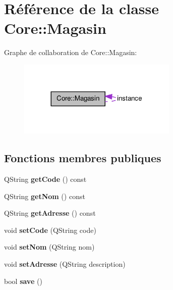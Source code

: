 \hypertarget{class_core_1_1_magasin}{
\section{Référence de la classe Core::Magasin}
\label{db/d58/class_core_1_1_magasin}
}


Graphe de collaboration de Core::Magasin:\nopagebreak
\begin{figure}[H]
\begin{center}
\leavevmode
\includegraphics[width=215pt]{dd/dd9/class_core_1_1_magasin__coll__graph}
\end{center}
\end{figure}
\subsection*{Fonctions membres publiques}
\begin{DoxyCompactItemize}
\item 
\hypertarget{class_core_1_1_magasin_a32b4c2ed780a53546f58adf1223a4ab2}{
QString {\bfseries getCode} () const }
\label{db/d58/class_core_1_1_magasin_a32b4c2ed780a53546f58adf1223a4ab2}

\item 
\hypertarget{class_core_1_1_magasin_a4a1c4c2061338b1e612f5ea5cf0f3078}{
QString {\bfseries getNom} () const }
\label{db/d58/class_core_1_1_magasin_a4a1c4c2061338b1e612f5ea5cf0f3078}

\item 
\hypertarget{class_core_1_1_magasin_a4fb857ff7d3a402cc979544fcfbdea2a}{
QString {\bfseries getAdresse} () const }
\label{db/d58/class_core_1_1_magasin_a4fb857ff7d3a402cc979544fcfbdea2a}

\item 
\hypertarget{class_core_1_1_magasin_a9008fda6fea2f34438477ff902ce0e58}{
void {\bfseries setCode} (QString code)}
\label{db/d58/class_core_1_1_magasin_a9008fda6fea2f34438477ff902ce0e58}

\item 
\hypertarget{class_core_1_1_magasin_a6b068992df353cb27b0230f9c6be4392}{
void {\bfseries setNom} (QString nom)}
\label{db/d58/class_core_1_1_magasin_a6b068992df353cb27b0230f9c6be4392}

\item 
\hypertarget{class_core_1_1_magasin_a51aff2a2720390d4dc68061df538a7bf}{
void {\bfseries setAdresse} (QString description)}
\label{db/d58/class_core_1_1_magasin_a51aff2a2720390d4dc68061df538a7bf}

\item 
\hypertarget{class_core_1_1_magasin_a20392ad98fbb23f6b9840b92f7613013}{
bool {\bfseries save} ()}
\label{db/d58/class_core_1_1_magasin_a20392ad98fbb23f6b9840b92f7613013}

\end{DoxyCompactItemize}
